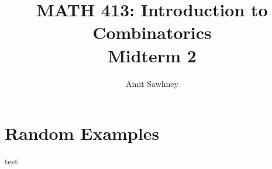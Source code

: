 \documentclass{report}
\title{\Huge{MATH 413: Introduction to Combinatorics}\\Midterm 2}
\author{\huge{Amit Sawhney}}
\date{}
\begin{document}
\maketitle
\newpage%
\pagebreak

\section*{Random Examples}
 test
\end{document}

